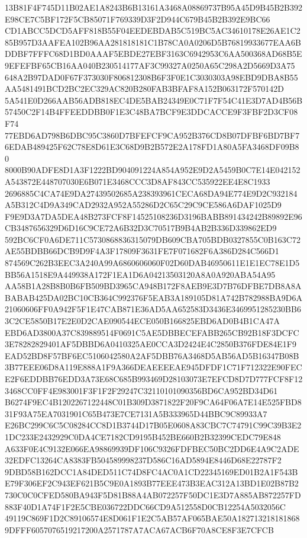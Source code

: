 \documentclass[UTF8,fontset=fandol,zihao=-4,a4paper]{ctexart}
\begin{document}
{{13B81F4F745D11B02AE1A8243B6B13161A3468A08869737B95A45D9B45B2B392E98CE7C5BF172F5CB85071F769339D3F2D944C679B45B2B392E9BC66
CD1ABCC5DCD5AFF818B55F04EEDEBDAB5C519BC5AC34610178E26AE1C285B957D3AAFEA102B96AA281818181C1B78CA0A0206D5B76819933677EAA6B
DDBF7FFFC68D1BD0AAAF5EBDE27EBF3163C6942953C6AA500368AD68B5E9EFEFBF65CB16AA040B230514177AF3C99327A0250A65C298A2D5669D3A75
648A2B97DAD0F67F373030F806812308B6F3F0E1C3030303A98EBD9DBA8B55AA5481491BCD2BC2EC329AC820B280FAB3BFAF8A152B063172F570142D
5A541E0D266AAB56ADB818EC4DE5BAB24349E0C71F7F54C41E3D7AD4B56B57450C2F14B4FFEEDDBB0F1E3C48BA7BCF9E3DDCACCE9F3FBF2D3CF08F74
77EBD6AD798B6DBC95C3860D7BFEFCF9CA952B376CD8B07DFBF6BD7BF76EDAB489425F62C78E8D61E3C68D9B2B572E2A178FD1A80A5FA3468DF09B80
8000B90ADFE8D1A3F1222BD904091224A854A952E9D2A5459B0C7E14E042152A543872E448707030E6B071E3468CCC3D8AF843CC535922EE4E8C1933
2696885C4CA74E9DA27439502685A238393961CECA68DA94E774E9D2C932184A5B312C4D9A349CAD2932A952A55286D2C65C29C9CE586A6DAF1025D9
F9E9D3A7DA5DEA48B273FCF8F14525108236D3196BABB891434242B89892E96CB3487656329D6D16C9CE72A6B32D3C70517B9B4AB2B336D339862ED9
592BC6CF0A6DE711C5730868836315079DB609CBA705BDB0327855C0B163C72AE55BDBB66DCB9D9F4A3F17809F3631FE7F071682F6A386D284C566D1
874569C262B3EEC3A240A99A6860606060F02D60DAB46950611E1E1EC78E1D5BB56A1518E9A449938A172F1EA1D6A04213503120A8A0A920ABA54A95
AA58B1A28B8B0B6FB509BD3965CA948B172F8AEB9E3D7B76DFBE7DB8A8ABABAB425DA02BC10CB364C992376F5EAB3A189105D81A742B782988BA9D6A
21060606FF0A942F5F1E47CAB871E36AD5AA652583D3436E3469951285230BB63C2CE5850B17E2E0D2CAE090544ECE050B166825EBD6AD0B4B1CA47A
EBD6AD3800A37C839889514F0691C5AE5DBBECEFABB265CB92B18F3DCFC3E78282829401AF5DBBD6A0410325AE0CCA3D2424E4C2850B376FDE84E1F9
EAD52BD8F57BF6EC5106042580A2AF5DBB76A3468D5AB56AD5B16347B08B3B77EEE06D8A119E888A1F9A366DEAEEEEAE945DFDF1C71F712322E90FEC
E2F6EDDBB76EDD3A73E68C685B993469D28103073E7EFCD8D7D777FCF8F123468CC0FF4E983001F3F1F2F29247C32110101090356BD6CA952BD34D61
B6274F9EC4B1202267122448C01B309D3871822F20F9CA64F06A7E14E525FBD831F93A75EA7031901C65B473E7CE7131A5B333965D44BBC9C89933A7
E26BC299C6C5C08284CC8D1B3744D17B05E0608A83CBC7C74791C99C39B3E21DC233E2432929C0DA4CE7182CD9195B452BE660B2B32399CEDC79E848
A633F0E4C9132E066EA98869939DF106C9326FDFBEC50BC2DD6E4A9C2ADE32EDFC13264CA8383FB504589998237D586C16AD5894E8446D68E22787F2
9DBD58B162DCC1A84DED511C74D8FC4AC0A1CD22345169ED01B2A1F543BE79F306EF2C943EF621B5C9E0A1893B77EEE473B3EAC312A13BD1E02B87B2
730C0C0CFED580BA943F5D81B88A4AB072257F50DC1E3D7A885AB872257FD883F40D1A74F1F2E5CBE036722DDC66CD9A512558D0CB12254A5032056C
49119C869F1D2C89106574E8D061F1E2C5AB57AF065BAE50A1827132181818689DFFF6057076519217200A2571787A7ACA67ACB6F70A8CE8F3E7CFCB
}}
\end{document}
